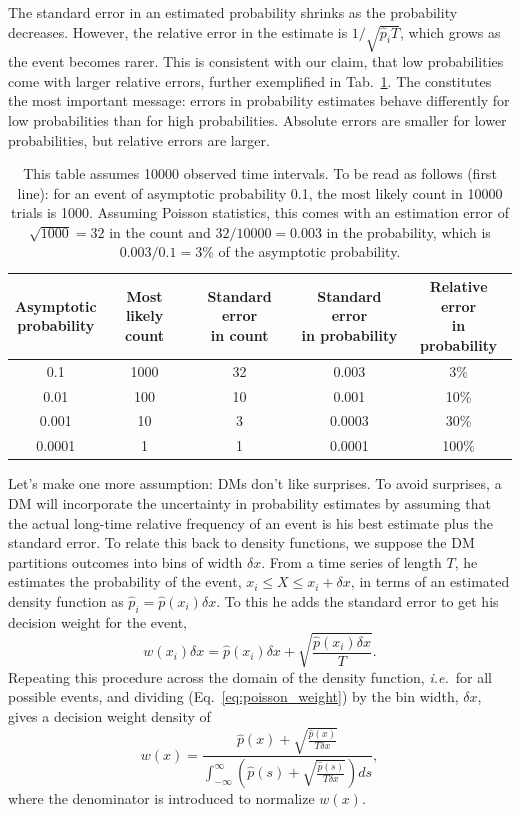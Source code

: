 \documentclass[a4paper, 12pt]{article}
\newcommand{\elabel}[1]{\label{eq:#1}}
\newcommand{\eref}[1]{(Eq.~\ref{eq:#1})}
\newcommand{\tlabel}[1]{\label{tab:#1}}
\newcommand{\tref}[1]{Tab.~\ref{tab:#1}}
\newcommand{\ie}{{\it i.e.}\ }
\newcommand{\be}{\begin{equation}}
\newcommand{\ee}{\end{equation}}
\begin{document}
The standard error in an estimated probability shrinks as the probability decreases. However, the relative error in the estimate is $1/\sqrt{\hat{p}_i T}$, which grows as the event becomes rarer. This is consistent with our claim, that low probabilities come with larger relative errors, further exemplified in \tref{errors}. The constitutes the most important message: errors in probability estimates behave differently for low probabilities than for high probabilities. Absolute errors are smaller for lower probabilities, but relative errors are larger. 
\begin{table}[!htb]
\centering
\begin{tabular}{@{}ccccc@{}}
\toprule[2pt]
\makecell{Asymptotic\\probability} & \makecell{Most likely\\count} & \makecell{Standard error\\in count} & \makecell{Standard error\\in probability} & \makecell{Relative error\\in probability}\\
\midrule[2pt]
0.1 & 1000 & 32 & 0.003 & 3\%\\
0.01 & 100 & 10 & 0.001 & 10\%\\
0.001 & 10 & 3 & 0.0003& 30\%\\
0.0001 & 1 & 1 & 0.0001 &100\%\\
\bottomrule[2pt]
\end{tabular}
\caption{This table assumes 10000 observed time intervals. To be read as follows (first line): for an event of asymptotic probability 0.1, the most likely count in 10000 trials is 1000. Assuming Poisson statistics, this comes with an estimation error of $\sqrt{1000} = 32$ in the count and $32/10000 = 0.003$ in the probability, which is $0.003/0.1=3\%$ of the asymptotic probability.}\tlabel{errors}
\end{table}

Let's make one more assumption: DMs don't like surprises. To avoid surprises, a DM will incorporate the uncertainty in probability estimates by assuming that the actual long-time relative frequency of an event is his best estimate plus the standard error. To relate this back to density functions, we suppose the DM partitions outcomes into bins of width $\delta x$. From a time series of length $T$, he estimates the probability of the event, $x_i \leq X \leq x_i+\delta x$, in terms of an estimated density function as $\hat{p}_i = \hat{p}(x_i)\delta x$. To this he adds the standard error to get his decision weight for the event,
\be
w(x_i)\delta x = \hat{p}(x_i)\delta x + \sqrt{\frac{\hat{p}(x_i)\delta x}{T}}.
\elabel{poisson_weight}
\ee
Repeating this procedure across the domain of the density function, \ie for all possible events, and dividing \eref{poisson_weight} by the bin width, $\delta x$, gives a decision weight density of
\be
w(x) = \frac{\hat{p}(x)+\sqrt{\frac{\hat{p}(x)}{T\delta x}}}{\int_{-\infty}^{\infty}\left(\hat{p}(s)+\sqrt{\frac{\hat{p}(s)}{T\delta x}}\right) ds},
\elabel{poisson_weight_density}
\ee
where the denominator is introduced to normalize $w(x)$.
\end{document}
